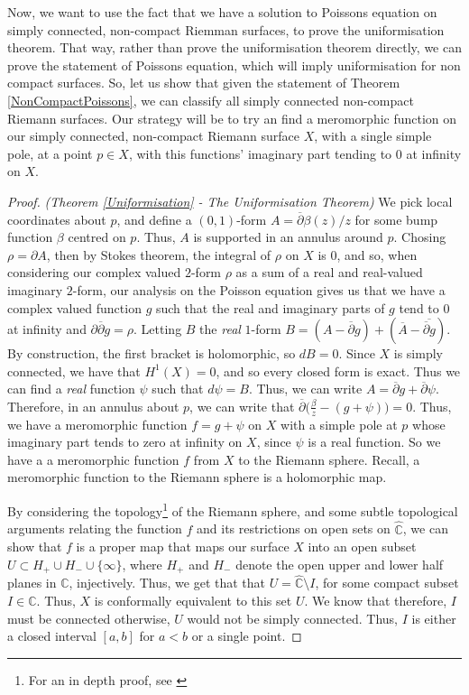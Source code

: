 \documentclass[11pt]{report}
\theoremstyle{definition}
\begin{document}
Now, we want to use the fact that we have a solution to Poissons equation on simply connected, non-compact Riemman surfaces, to prove the uniformisation theorem. That way, rather than prove the uniformisation theorem directly, we can prove the statement of Poissons equation, which will imply uniformisation for non compact surfaces. So, let us show that given the statement of Theorem \ref{NonCompactPoissons}, we can classify all simply connected non-compact Riemann surfaces.
Our strategy will be to try an find a meromorphic function on our simply connected, non-compact Riemann surface $X$, with a single simple pole, at a point $p \in X$, with this functions' imaginary part tending to $0$ at infinity on $X$.
\begin{proof} \emph{(Theorem \ref{Uniformisation} - The Uniformisation Theorem)}
We pick local coordinates about $p$, and define a $(0,1)$-form $A=\overline{\partial}\beta(z)/z$ for some bump function $\beta$ centred on $p$. Thus, $A$ is supported in an annulus around $p$. Chosing $\rho = \partial A$, then by Stokes theorem, the integral of $\rho$ on $X$ is $0$, and so, when considering our complex valued $2$-form $\rho$ as a sum of a real and real-valued imaginary $2$-form, our analysis on the Poisson equation gives us that we have a complex valued function $g$ such that the real and imaginary parts of $g$ tend to $0$ at infinity and $\partial\overline{\partial}g = \rho$. Letting $B$ the \emph{real} $1$-form $B=(A-\overline{\partial}g)+(\overline{A} - \overline{\overline{\partial}g})$. By construction, the first bracket is holomorphic, so $dB = 0$. Since $X$ is simply connected, we have that $H^1(X)=0$, and so every closed form is exact. Thus we can find a \emph{real} function $\psi$ such that $d\psi = B$. Thus, we can write $A = \overline{\partial}g + \overline{\partial}\psi$. Therefore, in an annulus about $p$, we can write that $\overline{\partial}\Big(\frac{\beta}{z} - (g+\psi)\Big) = 0$. Thus, we have a meromorphic function $f = g + \psi$ on $X$ with a simple pole at $p$ whose imaginary part tends to zero at infinity on $X$, since $\psi$ is a real function. So we have a a meromorphic function $f$ from $X$ to the Riemann sphere. Recall, a meromorphic function to the Riemann sphere is a holomorphic map. 

By considering the topology\footnote{For an in depth proof, see \cite[p.132-133]{donaldson}} of the Riemann sphere, and some subtle topological arguments relating the function $f$ and its restrictions on open sets on $\widehat{\mathbb{C}}$, we can show that $f$ is a proper map that maps our surface $X$ into an open subset $U \subset H_+\cup H_- \cup \{\infty\}$, where $H_+$ and $H_-$ denote the open upper and lower half planes in $\mathbb{C}$, injectively. Thus, we get that that $U = \widehat{\mathbb{C}}\setminus I$, for some compact subset $I \in \mathbb{C}$. Thus, $X$ is conformally equivalent to this set $U$. We know that therefore, $I$ must be connected otherwise, $U$ would not be simply connected. Thus, $I$ is either a closed interval $[a,b]$ for $a < b$ or a single point.


\end{proof}
\end{document}
